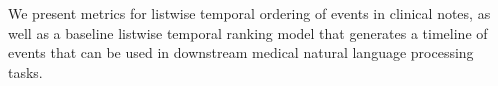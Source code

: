 We present metrics for listwise temporal ordering of events in clinical notes, as well as a baseline listwise temporal ranking model that generates a timeline of events that can be used in downstream medical natural language processing tasks.
